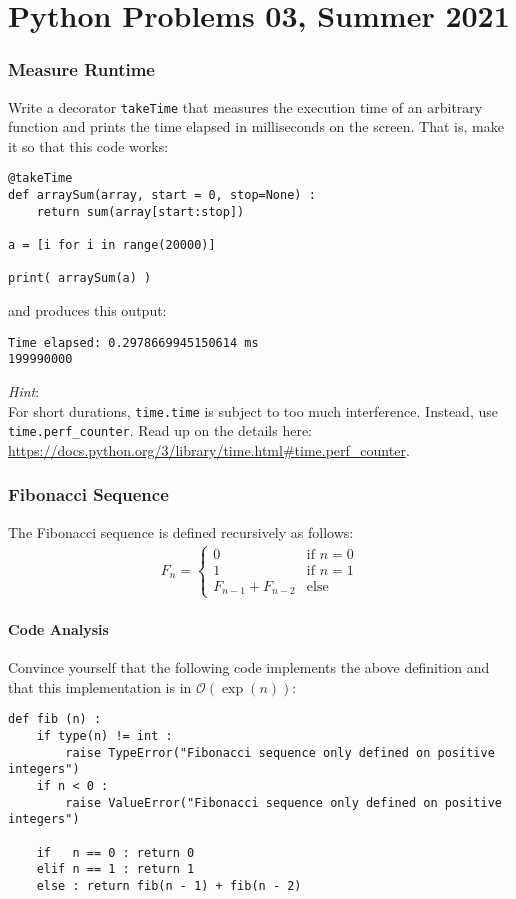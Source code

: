 \documentclass[
	english,
	fontsize=10pt,
	parskip=half,
	titlepage=true,
	DIV=12
]{scrartcl}
\begin{document}
\part*{Python Problems 03, Summer 2021}
\section{Measure Runtime}
Write a decorator \texttt{takeTime} that measures the execution time of an arbitrary function and prints the time elapsed in milliseconds on the screen. That is, make it so that this code works:

\begin{verbatim}
@takeTime
def arraySum(array, start = 0, stop=None) :
    return sum(array[start:stop])

a = [i for i in range(20000)]

print( arraySum(a) )
\end{verbatim}

and produces this output:

\begin{verbatim}
Time elapsed: 0.2978669945150614 ms
199990000
\end{verbatim}

\emph{Hint}:\\
For short durations, \texttt{time.time} is subject to too much interference. Instead, use \texttt{time.perf\_counter}. Read up on the details here: \url{https://docs.python.org/3/library/time.html#time.perf_counter}.

\section{Fibonacci Sequence}
The Fibonacci sequence is defined recursively as follows:
\begin{align*}
	F_n = \begin{cases}
		0 & \text{if } n = 0\\
		1 & \text{if } n = 1\\
		F_{n-1} + F_{n-2} & \text{else}
	\end{cases}
\end{align*}


\subsection{Code Analysis}
Convince yourself that the following code implements the above definition and that this implementation is in $\mathcal{O}( \exp(n) )$:
\begin{verbatim}
def fib (n) :
    if type(n) != int :
        raise TypeError("Fibonacci sequence only defined on positive integers")
    if n < 0 :
        raise ValueError("Fibonacci sequence only defined on positive integers")
        
    if   n == 0 : return 0
    elif n == 1 : return 1
    else : return fib(n - 1) + fib(n - 2)
\end{verbatim}
\end{document}
